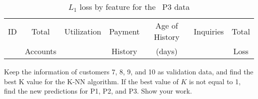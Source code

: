 \begin{table}[h]
  \centering
  \caption{$L_1$ loss by feature for the \featureOp\ P3 data}\label{tab:P01:b:P3}
  \begin{tabular}{|c||c|c|c|c|c||c|}
    \hline
    ID & Total    & Utilization & Payment & Age of History & Inquiries & Total \\
       & Accounts &             & History & (days)         &           & Loss \\\hline\hline
    
  \end{tabular}
\end{table}

\FloatBarrier
\begin{subproblem}
  Keep the information of customers 7, 8, 9, and 10 as validation data, and find the best K value for the K-NN algorithm. If the best value of $K$ is not equal to 1, find the new predictions for P1, P2, and P3. Show your work.
\end{subproblem}


